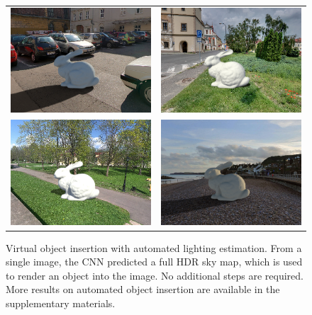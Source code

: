 \begin{figure}[!th]
    \centering
    \footnotesize
    \setlength{\tabcolsep}{1pt}
    \begin{tabular}{cc}
    \includegraphics[width=.47\linewidth]{./figures/renders/netout/pano_aaafspbtffjzbn_jpg-1_png_out.png} &
    \includegraphics[width=.47\linewidth]{./figures/renders/netout/pano_abauwcbvavypmw_jpg-2_png_out.png} \\
    \includegraphics[width=.47\linewidth]{./figures/renders/netout/pano_ajmdcorvpbtdcb_jpg-3_png_out.png} &
    \includegraphics[width=.47\linewidth]{./figures/renders/netout/pano_ajwnburtukssxf_jpg-5_png_out.png}
    \end{tabular}
    \caption{Virtual object insertion with automated lighting estimation. From a single image, the CNN predicted a full HDR sky map, which is used to render an object into the image. No additional steps are required. More results on automated object insertion are available in the supplementary materials.}
    \label{fig:evaluation_render_examples}
\end{figure}

